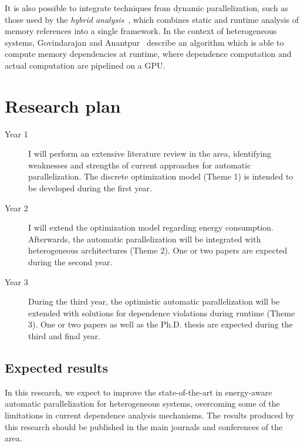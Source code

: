 \documentclass[a4paper,12pt]{article}
\newcommand\FIXME[1]{\textcolor{red}{FIX:}\textcolor{red}{#1}}
\begin{document}
It is also possible to integrate techniques from dynamic parallelization, such
as those used by the \emph{hybrid analysis}~\cite{rus03}, which combines static
and runtime analysis of memory references into a single framework.  In the
context of heterogeneous systems, Govindarajan and
Anantpur~\cite{govindarajan13} describe an algorithm which is able to compute
memory dependencies at runtime, where dependence computation and actual
computation are pipelined on a GPU.

\section{Research plan}

\begin{description}

\item[Year 1] I will perform an extensive literature review in the area,
identifying weaknesses and strengths of current approaches for automatic
parallelization.  The discrete optimization model (Theme 1) is intended to be
developed during the first year.

\item[Year 2] I will extend the optimization model regarding energy
consumption.  Afterwards, the automatic parallelization will be integrated with
heterogeneous architectures (Theme 2).  One or two papers are expected during
the second year.   

\item[Year 3] During the third year, the optimistic automatic parallelization
will be extended with solutions for dependence violations during runtime (Theme
3).  One or two papers as well as the Ph.D. thesis are expected during the
third and final year.

\end{description}

\subsection{Expected results}

In this research, we expect to improve the state-of-the-art in energy-aware
automatic parallelization for heterogeneous systems, overcoming some of the
limitations in current dependence analysis mechanisms.  The results produced by
this research should be published in the main journals and conferences of the
area.




\end{document}
